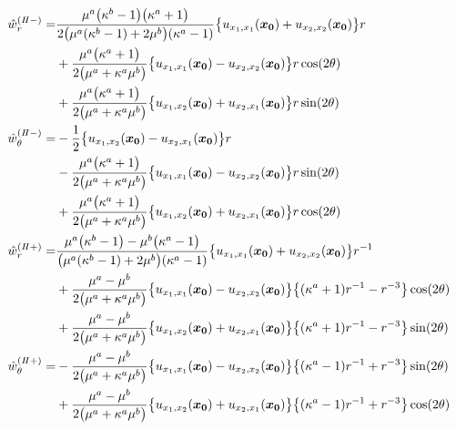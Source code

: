 \begin{align}
	\hat{w}_{r}^{(I\hspace{-.15em}I-)}=&
		\frac{\mu^{a}\bigl(\kappa^{b}-1\bigr)\bigl(\kappa^{a}+1\bigr)}{2\bigl(\mu^{a}(\kappa^{b}-1)+2\mu^{b}\bigr)(\kappa^{a}-1)}
		\bigl\{u_{x_{1},x_{1}}(\bm{x_{0}})+u_{x_{2},x_{2}}(\bm{x_{0}})\bigr\}r
		\nonumber
		\\
		&+\frac{\mu^{a}\bigl(\kappa^{a}+1\bigr)}{2\bigl(\mu^{a}+\kappa^{a}\mu^{b}\bigr)}
		\bigl\{u_{x_{1},x_{1}}(\bm{x_{0}})-u_{x_{2},x_{2}}(\bm{x_{0}})\bigr\}r\cos(2\theta)
		\nonumber
		\\
		&+\frac{\mu^{a}\bigl(\kappa^{a}+1\bigr)}{2\bigl(\mu^{a}+\kappa^{a}\mu^{b}\bigr)}
		\bigl\{u_{x_{1},x_{2}}(\bm{x_{0}})+u_{x_{2},x_{1}}(\bm{x_{0}})\bigr\}r\sin(2\theta)
		\\
	\hat{w}_{\theta}^{(I\hspace{-.15em}I-)}=&
		-\frac{1}{2}\bigl\{u_{x_{1},x_{2}}(\bm{x_{0}})-u_{x_{2},x_{1}}(\bm{x_{0}})\bigr\}r
		\nonumber
		\\
		&-\frac{\mu^{a}\bigl(\kappa^{a}+1\bigr)}{2\bigl(\mu^{a}+\kappa^{a}\mu^{b}\bigr)}
		\bigl\{u_{x_{1},x_{1}}(\bm{x_{0}})-u_{x_{2},x_{2}}(\bm{x_{0}})\bigr\}r\sin(2\theta)
		\nonumber
		\\
		&+\frac{\mu^{a}\bigl(\kappa^{a}+1\bigr)}{2\bigl(\mu^{a}+\kappa^{a}\mu^{b}\bigr)}
		\bigl\{u_{x_{1},x_{2}}(\bm{x_{0}})+u_{x_{2},x_{1}}(\bm{x_{0}})\bigr\}r\cos(2\theta)
		\\
	\hat{w}_{r}^{(I\hspace{-.15em}I+)}=&
		\frac{\mu^{a}\bigl(\kappa^{b}-1\bigr)-\mu^{b}\bigl(\kappa^{a}-1\bigr)}{\bigl(\mu^{a}(\kappa^{b}-1)+2\mu^{b}\bigr)(\kappa^{a}-1)}
		\bigl\{u_{x_{1},x_{1}}(\bm{x_{0}})+u_{x_{2},x_{2}}(\bm{x_{0}})\bigr\}r^{-1}
		\nonumber
		\\
		&+\frac{\mu^{a}-\mu^{b}}{2\bigl(\mu^{a}+\kappa^{a}\mu^{b}\bigr)}
		\bigl\{u_{x_{1},x_{1}}(\bm{x_{0}})-u_{x_{2},x_{2}}(\bm{x_{0}})\bigr\}
		\bigl\{(\kappa^{a}+1)r^{-1}-r^{-3}\bigr\}\cos(2\theta)
		\nonumber
		\\
		&+\frac{\mu^{a}-\mu^{b}}{2\bigl(\mu^{a}+\kappa^{a}\mu^{b}\bigr)}
		\bigl\{u_{x_{1},x_{2}}(\bm{x_{0}})+u_{x_{2},x_{1}}(\bm{x_{0}})\bigr\}
		\bigl\{(\kappa^{a}+1)r^{-1}-r^{-3}\bigr\}\sin(2\theta)
		\\
	\hat{w}_{\theta}^{(I\hspace{-.15em}I+)}=&
		-\frac{\mu^{a}-\mu^{b}}{2\bigl(\mu^{a}+\kappa^{a}\mu^{b}\bigr)}
		\bigl\{u_{x_{1},x_{1}}(\bm{x_{0}})-u_{x_{2},x_{2}}(\bm{x_{0}})\bigr\}
		\bigl\{(\kappa^{a}-1)r^{-1}+r^{-3}\bigr\}\sin(2\theta)
		\nonumber
		\\
		&+\frac{\mu^{a}-\mu^{b}}{2\bigl(\mu^{a}+\kappa^{a}\mu^{b}\bigr)}
		\bigl\{u_{x_{1},x_{2}}(\bm{x_{0}})+u_{x_{2},x_{1}}(\bm{x_{0}})\bigr\}
		\bigl\{(\kappa^{a}-1)r^{-1}+r^{-3}\bigr\}\cos(2\theta)
\end{align}

\newpage
